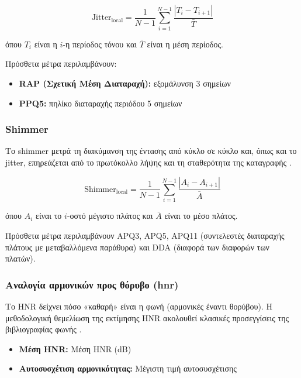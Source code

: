 \begin{equation}
\text{Jitter}_{\text{local}} = \frac{1}{N-1} \sum_{i=1}^{N-1} \frac{|T_i - T_{i+1}|}{\bar{T}}
\label{eq:jitter-local}
\end{equation}

όπου $T_i$ είναι η $i$-η περίοδος τόνου και $\bar{T}$ είναι η μέση περίοδος.

Πρόσθετα μέτρα περιλαμβάνουν:
\begin{itemize}
    \item \textbf{RAP (Σχετική Μέση Διαταραχή):} εξομάλυνση 3 σημείων
    \item \textbf{PPQ5:} πηλίκο διαταραχής περιόδου 5 σημείων
\end{itemize}

\subsubsection{Shimmer}

Το \gls{shimmer} μετρά τη διακύμανση της έντασης από κύκλο σε κύκλο και, όπως και το \gls{jitter}, επηρεάζεται από το πρωτόκολλο λήψης και τη σταθερότητα της καταγραφής \citep{gelfer1995jittershimmer}.

\begin{equation}
\text{Shimmer}_{\text{local}} = \frac{1}{N-1} \sum_{i=1}^{N-1} \frac{|A_i - A_{i+1}|}{\bar{A}}
\label{eq:shimmer-local}
\end{equation}

όπου $A_i$ είναι το $i$-οστό μέγιστο πλάτος και $\bar{A}$ είναι το μέσο πλάτος.

Πρόσθετα μέτρα περιλαμβάνουν APQ3, APQ5, APQ11 (συντελεστές διαταραχής πλάτους με μεταβαλλόμενα παράθυρα) και DDA (διαφορά των διαφορών των πλατών).

\subsubsection{Αναλογία αρμονικών προς θόρυβο (\gls{hnr})}

Το HNR δείχνει πόσο «καθαρή» είναι η φωνή (αρμονικές έναντι θορύβου). Η μεθοδολογική θεμελίωση της εκτίμησης HNR ακολουθεί κλασικές προσεγγίσεις της βιβλιογραφίας φωνής \citep{awan1994hnr}.

\begin{itemize}
    \item \textbf{Μέση HNR:} Μέση HNR (dB)
    \item \textbf{Αυτοσυσχέτιση αρμονικότητας:} Μέγιστη τιμή αυτοσυσχέτισης
\end{itemize}

